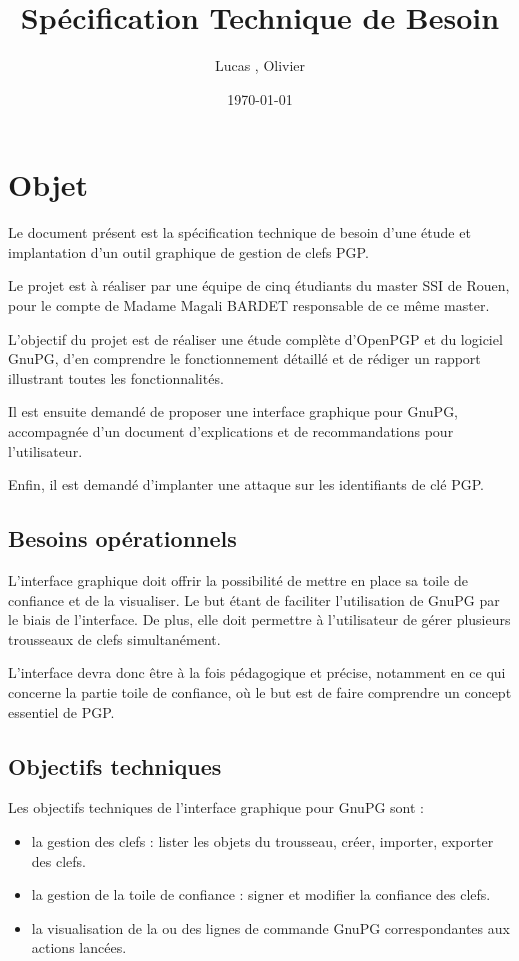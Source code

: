 \documentclass{../res/univ-projet}
\title{Spécification Technique de Besoin}
\author{Lucas \bsc{Barbay}, Olivier \bsc{Thibault}}
\date{\today}
\begin{document}
\maketitle
\newpage
\tableofcontents

\newpage

\section{Objet}

Le document présent est la spécification technique de besoin d'une étude et implantation d'un outil graphique de gestion de clefs PGP.

Le projet est à réaliser par une équipe de cinq étudiants du master SSI de Rouen, pour le compte de Madame Magali BARDET responsable de ce même master. 

L'objectif du projet est de réaliser une étude complète d'OpenPGP et du logiciel GnuPG, d'en comprendre le fonctionnement détaillé et de rédiger un rapport illustrant toutes les fonctionnalités.

Il est ensuite demandé de proposer une interface graphique pour GnuPG, accompagnée d'un document d'explications et de recommandations pour l'utilisateur.

Enfin, il est demandé d'implanter une attaque sur les identifiants de clé PGP.

\subsection{Besoins opérationnels}
L'interface graphique doit offrir la possibilité de mettre en place sa toile de confiance et de la visualiser. Le but étant de faciliter l'utilisation de GnuPG par le biais de l'interface. De plus, elle doit permettre à l'utilisateur de gérer plusieurs trousseaux de clefs simultanément.

L'interface devra donc être à la fois pédagogique et précise, notamment en ce qui concerne la partie toile de confiance, où le but est de faire comprendre un concept essentiel de PGP.

\subsection{Objectifs techniques}

Les objectifs techniques de l'interface graphique pour GnuPG sont :
\begin{itemize}
 \item la gestion des clefs : lister les objets du trousseau, créer, importer, exporter des clefs.
 \item la gestion de la toile de confiance : signer et modifier la confiance des clefs.
 \item la visualisation de la ou des lignes de commande GnuPG correspondantes aux actions lancées.
\end{itemize}
\end{document}
